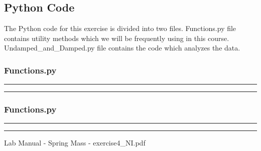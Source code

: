 \documentclass[letterpaper,12pt]{article}
\begin{document}
\pagebreak

\subsection{Python Code}

The Python code for this exercise is divided into two files. Functions.py file contains utility methods
which we will be frequently using in this course. Undamped\_and\_Damped.py file contains the code which analyzes
the data.

\subsubsection{Functions.py}
\noindent\rule{\textwidth}{1pt}

\noindent\rule{\textwidth}{1pt}

\subsubsection{Functions.py}
\noindent\rule{\textwidth}{1pt}

\noindent\rule{\textwidth}{1pt}

\begin{thebibliography}{99}

 Lab Manual - Spring Mass - exercise4\_NI.pdf

\end{thebibliography}
\end{document}
